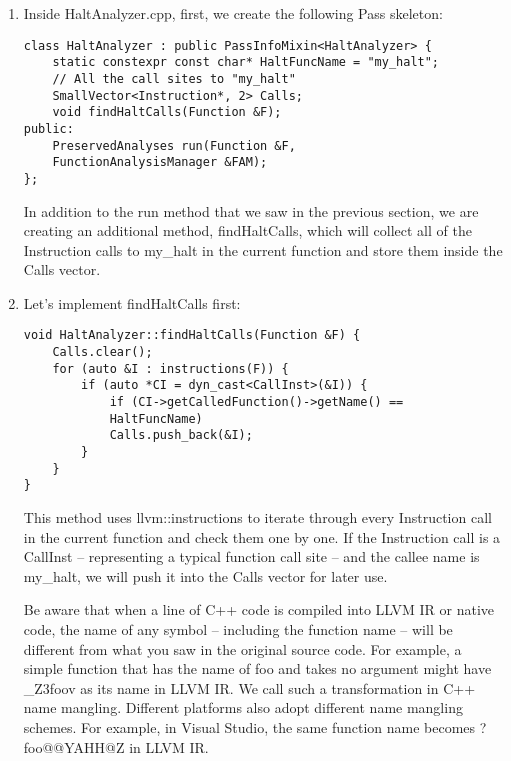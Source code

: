 \begin{enumerate}
\item Inside HaltAnalyzer.cpp, first, we create the following Pass skeleton:

\begin{lstlisting}[style=styleCXX]
class HaltAnalyzer : public PassInfoMixin<HaltAnalyzer> {
	static constexpr const char* HaltFuncName = "my_halt";
	// All the call sites to "my_halt"
	SmallVector<Instruction*, 2> Calls;
	void findHaltCalls(Function &F);
public:
	PreservedAnalyses run(Function &F,
	FunctionAnalysisManager &FAM);
};
\end{lstlisting}

In addition to the run method that we saw in the previous section, we are creating an additional method, findHaltCalls, which will collect all of the Instruction calls to my\_halt in the current function and store them inside the Calls vector.

\item Let's implement findHaltCalls first:

\begin{lstlisting}[style=styleCXX]
void HaltAnalyzer::findHaltCalls(Function &F) {
	Calls.clear();
	for (auto &I : instructions(F)) {
		if (auto *CI = dyn_cast<CallInst>(&I)) {
			if (CI->getCalledFunction()->getName() ==
			HaltFuncName)
			Calls.push_back(&I);
		}
	}
}
\end{lstlisting}

This method uses llvm::instructions to iterate through every Instruction call in the current function and check them one by one. If the Instruction call is a CallInst – representing a typical function call site – and the callee name is my\_halt, we will push it into the Calls vector for later use.

\begin{tcolorbox}[colback=blue!5!white,colframe=blue!75!black, fonttitle=\bfseries,title=Function name mangling]	
\hspace*{0.7cm}Be aware that when a line of C++ code is compiled into LLVM IR or native code, the name of any symbol – including the function name – will be different from what you saw in the original source code. For example, a simple function that has the name of foo and takes no argument might have \_Z3foov as its name in LLVM IR. We call such a transformation in C++ name mangling. Different platforms also adopt different name mangling schemes. For example, in Visual Studio, the same function name becomes ?foo@@YAHH@Z in LLVM IR.
\end{tcolorbox}


\end{enumerate}
